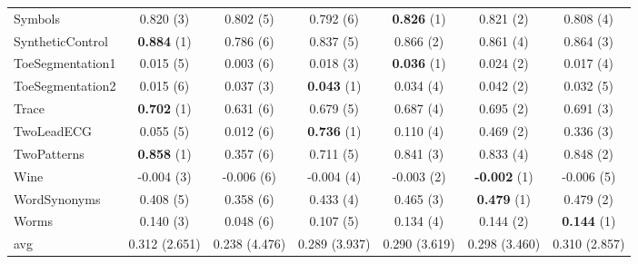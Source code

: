 \begin{table}[ht]
\begin{adjustbox}{width=\textwidth}
\begin{tabular}{lcccccc}
    Symbols & 0.820 (3) & 0.802 (5) & 0.792 (6) & \textbf{0.826} (1) & 0.821 (2) & 0.808 (4) \\
    SyntheticControl & \textbf{0.884} (1) & 0.786 (6) & 0.837 (5) & 0.866 (2) & 0.861 (4) & 0.864 (3) \\
    ToeSegmentation1 & 0.015 (5) & 0.003 (6) & 0.018 (3) & \textbf{0.036} (1) & 0.024 (2) & 0.017 (4) \\
    ToeSegmentation2 & 0.015 (6) & 0.037 (3) & \textbf{0.043} (1) & 0.034 (4) & 0.042 (2) & 0.032 (5) \\
    Trace & \textbf{0.702} (1) & 0.631 (6) & 0.679 (5) & 0.687 (4) & 0.695 (2) & 0.691 (3) \\
    TwoLeadECG & 0.055 (5) & 0.012 (6) & \textbf{0.736} (1) & 0.110 (4) & 0.469 (2) & 0.336 (3) \\
    TwoPatterns & \textbf{0.858} (1) & 0.357 (6) & 0.711 (5) & 0.841 (3) & 0.833 (4) & 0.848 (2) \\
    Wine & -0.004 (3) & -0.006 (6) & -0.004 (4) & -0.003 (2) & \textbf{-0.002} (1) & -0.006 (5) \\
    WordSynonyms & 0.408 (5) & 0.358 (6) & 0.433 (4) & 0.465 (3) & \textbf{0.479} (1) & 0.479 (2) \\
    Worms & 0.140 (3) & 0.048 (6) & 0.107 (5) & 0.134 (4) & 0.144 (2) & \textbf{0.144} (1) \\
    \hline 
    avg & 0.312 (2.651) & 0.238 (4.476) & 0.289 (3.937) & 0.290 (3.619) & 0.298 (3.460) & 0.310 (2.857) \\ 
    \hline
    \end{tabular}
    \end{adjustbox}
    \end{table}
    
    
    
